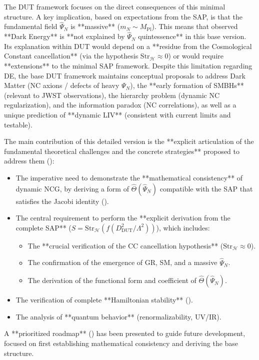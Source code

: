 \documentclass[11pt, a4paper]{article}
\theoremstyle{remark}
\newcommand{\Op}[1]{\hat{#1}}
\newcommand{\Str}{\mathrm{Str}}
\newcommand{\Mpl}{M_{\mathrm{Pl}}}
\begin{document}
The DUT framework focuses on the direct consequences of this minimal structure. A key implication, based on expectations from the SAP, is that the fundamental field \( \Op{\Psi}_N \) is **massive** (\(m_N \sim \Mpl\)). This means that observed **Dark Energy** is **not explained by \( \Op{\Psi}_N \) quintessence** in this base version. Its explanation within DUT would depend on a **residue from the Cosmological Constant cancellation** (via the hypothesis \( \Str_{\mathcal{H}} \approx 0 \)) or would require **extensions** to the minimal SAP framework. Despite this limitation regarding DE, the base DUT framework maintains conceptual proposals to address Dark Matter (NC axions / defects of heavy \( \Psi_N \)), the **early formation of SMBHs** (relevant to JWST observations), the hierarchy problem (dynamic NC regularization), and the information paradox (NC correlations), as well as a unique prediction of **dynamic LIV** (consistent with current limits and testable).

The main contribution of this detailed version is the **explicit articulation of the fundamental theoretical challenges and the concrete strategies** proposed to address them ():
\begin{itemize}
    \item The imperative need to demonstrate the **mathematical consistency** of dynamic NCG, by deriving a form of \( \Op{\Theta}(\Op{\Psi}_N) \) compatible with the SAP that satisfies the Jacobi identity ().
    \item The central requirement to perform the **explicit derivation from the complete SAP** (\( S = \Str_{\mathcal{H}}(f(D_{\text{DUT}}^2/\Lambda^2)) \)), which includes:
        \begin{itemize}
            \item The **crucial verification of the CC cancellation hypothesis** (\( \Str_{\mathcal{H}} \approx 0 \)).
            \item The confirmation of the emergence of GR, SM, and a massive \( \Op{\Psi}_N \).
            \item The derivation of the functional form and coefficient of \( \Op{\Theta}(\Op{\Psi}_N) \).
        \end{itemize}
    \item The verification of complete **Hamiltonian stability** ().
    \item The analysis of **quantum behavior** (renormalizability, UV/IR).
\end{itemize}
A **prioritized roadmap** () has been presented to guide future development, focused on first establishing mathematical consistency and deriving the base structure.
\end{document}

